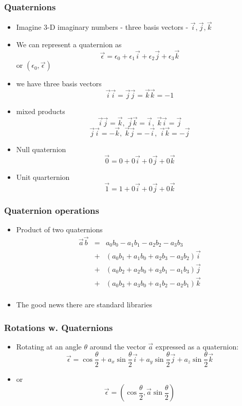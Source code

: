 \documentclass[10pt]{beamer}
\begin{document}
\begin{frame}
  \frametitle{Quaternions}
  \begin{itemize}
  \item Imagine 3-D imaginary numbers - three basis vectors - $\vec{i}, \vec{j}, \vec{k}$
  \item We can represent a quaternion as
    \[
      \vec{\epsilon} = \epsilon_0 + \epsilon_1 \vec{i} + \epsilon_2 \vec{j} + \epsilon_3 \vec{k}
    \]
    or $(\epsilon_0,\vec{\epsilon})$
    \pause
  \item we have three basis vectors
    \[ \vec{i}\vec{i} = \vec{j}\vec{j} = \vec{k}\vec{k} = -1 \]
  \item mixed products
    \[ \vec{i}\vec{j}=\vec{k}, ~ \vec{j}\vec{k} = \vec{i}, ~ \vec{k}\vec{i} = \vec{j}
    \]
    \[
      \vec{j}\vec{i} = -\vec{k}, ~ \vec{k}\vec{j} = -\vec{i}, ~ \vec{i}\vec{k} = -\vec{j}
    \]
  \item Null quaternion
    \[ \vec{0} = 0 + 0\vec{i} + 0 \vec{j} + 0 \vec{k} \]
  \item Unit quarternion
    \[ \vec{1} = 1 + 0 \vec{i} + 0 \vec{j} + 0 \vec{k} \]
  \end{itemize}
\end{frame}

\begin{frame}
  \frametitle{Quaternion operations}
  \begin{itemize}
  \item Product of two quaternions
    \[
      \begin{array}{ccc}
        \vec{a}\vec{b} & = & a_0 b_0 - a_1 b_1-a_2 b_2-a_3 b_3\\
                       & +  & (a_0 b_1 + a_1 b_0 + a_2 b_3 - a_3 b_2 ) \vec{i} \\
                       & +  & (a_0 b_2 + a_2 b_0 + a_3 b_1 - a_1 b_3) \vec{j} \\
                       & +  & (a_0 b_3 + a_3 b_0 + a_1 b_2 - a_2 b_1) \vec{k} \\
      \end{array}
    \]
  \item The good news there are standard libraries
  \end{itemize}
\end{frame}

\begin{frame}
  \frametitle{Rotations w. Quaternions}
  \begin{itemize}
  \item Rotating at an angle $\theta$ around the vector $\vec{a}$ expressed as a quaternion:
    \[
      \vec{\epsilon} = \cos \frac{\theta}{2} + a_x \sin \frac{\theta}{2} \vec{i}
      + a_y \sin \frac{\theta}{2} \vec{j} + a_z \sin \frac{\theta}{2} \vec{k}
    \]    
  \item or
    \[
      \vec{\epsilon} = ( \cos \frac{\theta}{2}, \vec{a} \sin \frac{\theta}{2} )
    \]
  \end{itemize}
\end{frame}
\end{document}
